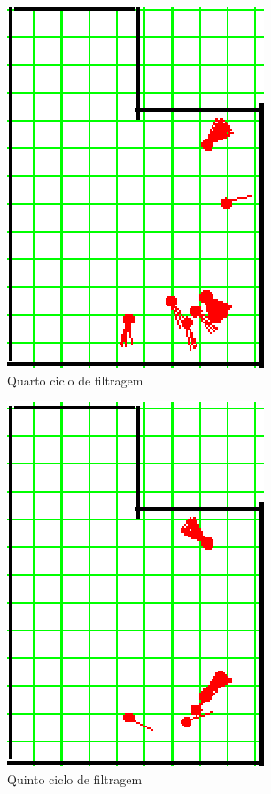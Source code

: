 \begin{figure}[H]
  \centering
  \includegraphics[scale=1]{figuras/cen4_ex5/5.eps}
  \caption[Quarto Ciclo de Filtragem]{Quarto ciclo de filtragem}
  \label{img:cen4_ex5_5}
\end{figure}

\begin{figure}[H]
  \centering
  \includegraphics[scale=1]{figuras/cen4_ex5/6.eps}
  \caption[Quinto Ciclo de Filtragem]{Quinto ciclo de filtragem}
  \label{img:cen4_ex5_6}
\end{figure}

